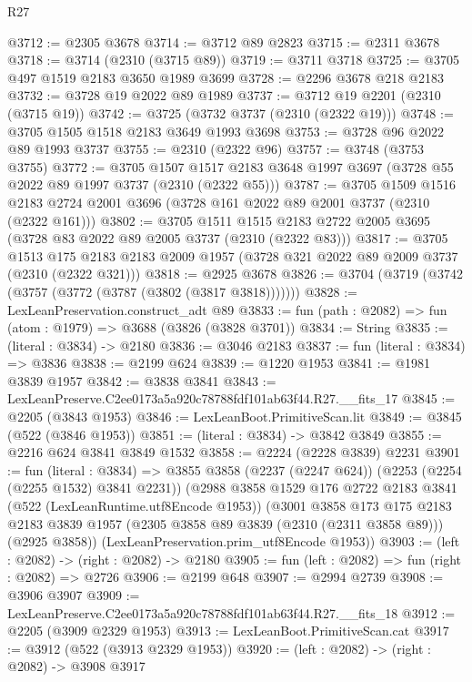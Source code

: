 \begin{lexlean}{R27}
\begin{coremodule}
@3712 := @2305 @3678
@3714 := @3712 @89 @2823
@3715 := @2311 @3678
@3718 := @3714 (@2310 (@3715 @89))
@3719 := @3711 @3718
@3725 := @3705 @497 @1519 @2183 @3650 @1989 @3699
@3728 := @2296 @3678 @218 @2183
@3732 := @3728 @19 @2022 @89 @1989
@3737 := @3712 @19 @2201 (@2310 (@3715 @19))
@3742 := @3725 (@3732 @3737 (@2310 (@2322 @19)))
@3748 := @3705 @1505 @1518 @2183 @3649 @1993 @3698
@3753 := @3728 @96 @2022 @89 @1993 @3737
@3755 := @2310 (@2322 @96)
@3757 := @3748 (@3753 @3755)
@3772 := @3705
    @1507
    @1517
    @2183
    @3648
    @1997
    @3697
    (@3728 @55 @2022 @89 @1997 @3737 (@2310 (@2322 @55)))
@3787 := @3705
    @1509
    @1516
    @2183
    @2724
    @2001
    @3696
    (@3728 @161 @2022 @89 @2001 @3737 (@2310 (@2322 @161)))
@3802 := @3705
    @1511
    @1515
    @2183
    @2722
    @2005
    @3695
    (@3728 @83 @2022 @89 @2005 @3737 (@2310 (@2322 @83)))
@3817 := @3705
    @1513
    @175
    @2183
    @2183
    @2009
    @1957
    (@3728 @321 @2022 @89 @2009 @3737 (@2310 (@2322 @321)))
@3818 := @2925 @3678
@3826 := @3704 (@3719 (@3742 (@3757 (@3772 (@3787 (@3802 (@3817 @3818)))))))
@3828 := LexLeanPreservation.construct_adt @89
@3833 := fun (path : @2082) => fun (atom : @1979) => @3688 (@3826 (@3828 @3701))
@3834 := String
@3835 := (literal : @3834) -> @2180
@3836 := @3046 @2183
@3837 := fun (literal : @3834) => @3836
@3838 := @2199 @624
@3839 := @1220 @1953
@3841 := @1981 @3839 @1957
@3842 := @3838 @3841
@3843 := LexLeanPreserve.C2ee0173a5a920c78788fdf101ab63f44.R27.__fits_17
@3845 := @2205 (@3843 @1953)
@3846 := LexLeanBoot.PrimitiveScan.lit
@3849 := @3845 (@522 (@3846 @1953))
@3851 := (literal : @3834) -> @3842 @3849
@3855 := @2216 @624 @3841 @3849 @1532
@3858 := @2224 (@2228 @3839) @2231
@3901 := fun (literal : @3834) =>
  @3855
    @3858
    (@2237 (@2247 @624))
    (@2253 (@2254 (@2255 @1532) @3841 @2231))
    (@2988
      @3858
      @1529
      @176
      @2722
      @2183
      @3841
      (@522 (LexLeanRuntime.utf8Encode @1953))
      (@3001
        @3858
        @173
        @175
        @2183
        @2183
        @3839
        @1957
        (@2305 @3858 @89 @3839 (@2310 (@2311 @3858 @89)))
        (@2925 @3858))
      (LexLeanPreservation.prim_utf8Encode @1953))
@3903 := (left : @2082) -> (right : @2082) -> @2180
@3905 := fun (left : @2082) => fun (right : @2082) => @2726
@3906 := @2199 @648
@3907 := @2994 @2739
@3908 := @3906 @3907
@3909 := LexLeanPreserve.C2ee0173a5a920c78788fdf101ab63f44.R27.__fits_18
@3912 := @2205 (@3909 @2329 @1953)
@3913 := LexLeanBoot.PrimitiveScan.cat
@3917 := @3912 (@522 (@3913 @2329 @1953))
@3920 := (left : @2082) -> (right : @2082) -> @3908 @3917

\end{coremodule}
\end{lexlean}
